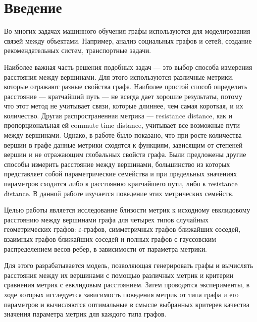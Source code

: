 \chapter*{Введение}							%

Во многих задачах машинного обучения графы используются для моделирования связей между объектами. Например, анализ социальных графов и сетей, создание рекомендательных систем, транспортные задачи.

Наиболее важная часть решения подобных задач --- это выбор способа измерения расстояния между вершинами. Для этого используются различные метрики, которые отражают разные свойства графа. Наиболее простой способ определить расстояние --- кратчайший путь --- не всегда дает хорошие результаты, потому что этот метод не учитывает связи, которые длиннее, чем самая короткая, и их количество. Другая распространенная метрика --- resistance distance, как и пропорциональная ей commute time distance, учитывает все возможные пути между вершинами. Однако, в работе \cite{von2014hitting} было показано, что при росте количества вершин в графе данные метрики сходятся к функциям, зависящим от степеней вершин и не отражающим глобальных свойств графа. Были предложены другие способы измерить расстояние между вершинами, большинство из которых представляет собой параметрические семейства и при предельных значениях параметров сходится либо к расстоянию кратчайшего пути, либо к resistance distance. В данной работе изучается поведение этих метрических семейств.

Целью работы является исследование близости метрик к исходному евклидовому расстоянию между вершинами графа для четырех типов случайных геометрических графов:  $\varepsilon$-графов, симметричных графов ближайших соседей, взаимных графов ближайших соседей и полных графов с гауссовским распределением весов ребер, в зависимости от параметра метрики.

Для этого разрабатывается модель, позволяющая генерировать графы и вычислять расстояния между их вершинами с помощью различных метрик и критерии сравнения метрик с евклидовым расстоянием. Затем проводятся эксперименты, в ходе которых исследуется зависимость поведения метрик от типа графа и его параметров и вычисляются оптимальные в смысле выбранных критерев качества значения параметра метрик для каждого типа графов.


\clearpage